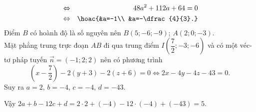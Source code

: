 \begin{ex}
{\begin{itemize}
\begin{eqnarray*}
			&\Leftrightarrow& 48a^2+112a+64=0
			\\
			&\Leftrightarrow&\hoac{&a=-1\\ &a=-\dfrac{4}{3}.}			
		\end{eqnarray*}
		Điểm $B$ có hoành độ là số nguyên nên $B(5;-6;-9)$; $A(2; 0;-3)$.\\
		Mặt phẳng trung trực đoạn $AB$ đi qua trung điểm $I\left(\dfrac{7}{2};-3;-6\right)$ và có một véc-tơ pháp tuyến $\vec{n}=(-1; 2; 2)$ nên có phương trình \[\left(x-\dfrac{7}{2}\right)-2(y+3)-2(z+6)=0\Leftrightarrow 2x-4y-4z-43=0.\]
		Suy ra $a=2$, $b=-4$, $c=-4$, $d=-43$.
	\end{itemize}
		Vậy $2a+b-12c+d=2\cdot 2+(-4)-12\cdot (-4)+(-43)=5$.
}
\end{ex}

